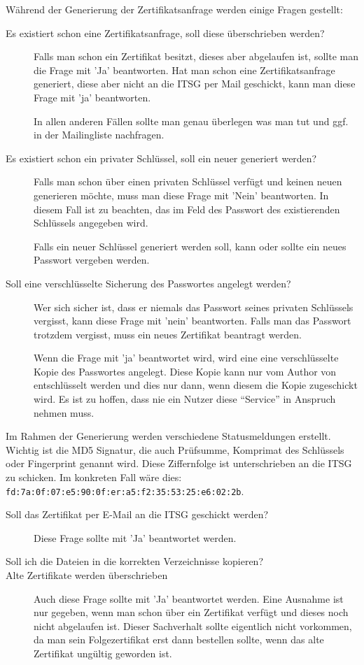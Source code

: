 Während der Generierung der Zertifikatsanfrage werden einige Fragen gestellt:
\begin{description}
\item[Es existiert schon eine Zertifikatsanfrage, soll diese überschrieben
werden?]
Falls man schon ein Zertifikat besitzt, dieses aber abgelaufen ist, sollte
man die Frage mit 'Ja' beantworten. Hat man schon eine Zertifikatsanfrage
generiert, diese aber nicht an die ITSG per Mail geschickt, kann man diese
Frage mit 'ja' beantworten. 

In allen anderen Fällen sollte man genau
überlegen was man tut und ggf. in der \tinyHeb\/ Mailingliste nachfragen.

\item[Es existiert schon ein privater Schlüssel, soll ein neuer generiert
werden?]
Falls man schon über einen privaten Schlüssel verfügt und keinen neuen
generieren möchte, muss man diese Frage mit 'Nein' beantworten. In diesem
Fall ist zu beachten, das im Feld  des
Passwort des existierenden Schlüssels angegeben wird. 

Falls ein neuer
Schlüssel generiert werden soll, kann oder sollte ein neues Passwort vergeben
werden.

\item[Soll eine verschlüsselte Sicherung des Passwortes angelegt werden?]
Wer sich sicher ist, dass er niemals das Passwort seines privaten Schlüssels
vergisst, kann diese Frage mit 'nein' beantworten. Falls man das Passwort
trotzdem vergisst, muss ein neues Zertifikat beantragt werden.

Wenn die Frage mit 'ja' beantwortet wird, wird eine eine verschlüsselte
Kopie des Passwortes angelegt. Diese Kopie kann nur vom Author von 
\tinyHeb\/ entschlüsselt werden und dies nur dann, wenn diesem die Kopie 
zugeschickt wird. Es ist zu hoffen, dass nie ein Nutzer diese ``Service''
in Anspruch nehmen muss.

\end{description}

Im Rahmen der Generierung werden verschiedene Statusmeldungen erstellt.
Wichtig ist die MD5 Signatur, die auch Prüfsumme, Komprimat des Schlüssels
\marginline{\Huge\bfseries!}%
oder Fingerprint genannt wird. Diese Ziffernfolge ist unterschrieben an
die ITSG zu schicken. Im konkreten Fall wäre dies:
\verb|fd:7a:0f:07:e5:90:0f:er:a5:f2:35:53:25:e6:02:2b|.

\begin{description}
\item[Soll das Zertifikat per E-Mail an die ITSG geschickt werden?]
Diese Frage sollte mit 'Ja' beantwortet werden.

\item[Soll ich die Dateien in die korrekten Verzeichnisse kopieren?\\
 Alte Zertifikate werden überschrieben]
Auch diese Frage sollte mit 'Ja' beantwortet werden. Eine Ausnahme ist nur
gegeben, wenn man schon über ein Zertifikat verfügt und dieses noch nicht 
abgelaufen ist. Dieser Sachverhalt sollte eigentlich nicht vorkommen, da man
sein Folgezertifikat erst dann bestellen sollte, wenn das alte Zertifikat
ungültig geworden ist.
\end{description}


